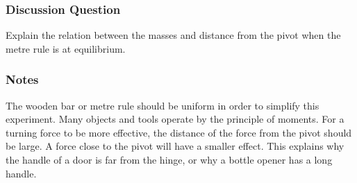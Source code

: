 \subsubsection*{Discussion Question}
Explain the relation between the masses and distance from the pivot when the metre rule is at equilibrium.

\subsubsection*{Notes}
The wooden bar or metre rule should be uniform in order to simplify this experiment.
Many objects and tools operate by the principle of moments.  For a turning force to be more effective, the distance of the force from the pivot should be large.  A force close to the pivot will have a smaller effect.  This explains why the handle of a door is far from the hinge, or why a bottle opener has a long handle.
